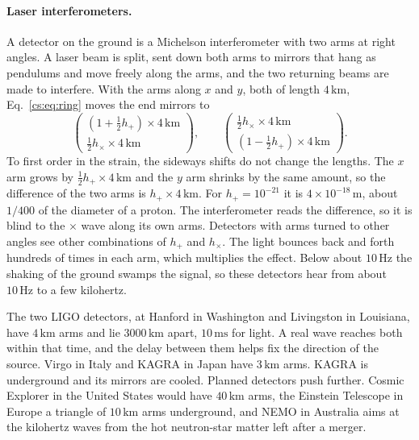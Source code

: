 \paragraph{Laser interferometers.} A detector on the ground is a Michelson interferometer with two arms at right angles. A laser beam is split, sent down both arms to mirrors that hang as pendulums and move freely along the arms, and the two returning beams are made to interfere. With the arms along $x$ and $y$, both of length $4\,\mathrm{km}$, Eq.~\eqref{cs:eq:ring} moves the end mirrors to
\[
\begin{pmatrix} (1+\tfrac12h_+)\times4\,\mathrm{km}\\ \tfrac12h_\times\times4\,\mathrm{km}\end{pmatrix},\qquad
\begin{pmatrix} \tfrac12h_\times\times4\,\mathrm{km}\\ (1-\tfrac12h_+)\times4\,\mathrm{km}\end{pmatrix}.
\]
To first order in the strain, the sideways shifts do not change the lengths. The $x$ arm grows by $\tfrac12h_+\times4\,\mathrm{km}$ and the $y$ arm shrinks by the same amount, so the difference of the two arms is $h_+\times4\,\mathrm{km}$. For $h_+=10^{-21}$ it is $4\times10^{-18}\,\mathrm m$, about $1/400$ of the diameter of a proton. The interferometer reads the difference, so it is blind to the $\times$ wave along its own arms. Detectors with arms turned to other angles see other combinations of $h_+$ and $h_\times$. The light bounces back and forth hundreds of times in each arm, which multiplies the effect. Below about $10\,\mathrm{Hz}$ the shaking of the ground swamps the signal, so these detectors hear from about $10\,\mathrm{Hz}$ to a few kilohertz.

The two LIGO detectors, at Hanford in Washington and Livingston in Louisiana, have $4\,\mathrm{km}$ arms and lie $3000\,\mathrm{km}$ apart, $10\,\mathrm{ms}$ for light. A real wave reaches both within that time, and the delay between them helps fix the direction of the source. Virgo in Italy and KAGRA in Japan have $3\,\mathrm{km}$ arms. KAGRA is underground and its mirrors are cooled. Planned detectors push further. Cosmic Explorer in the United States would have $40\,\mathrm{km}$ arms, the Einstein Telescope in Europe a triangle of $10\,\mathrm{km}$ arms underground, and NEMO in Australia aims at the kilohertz waves from the hot neutron-star matter left after a merger.


